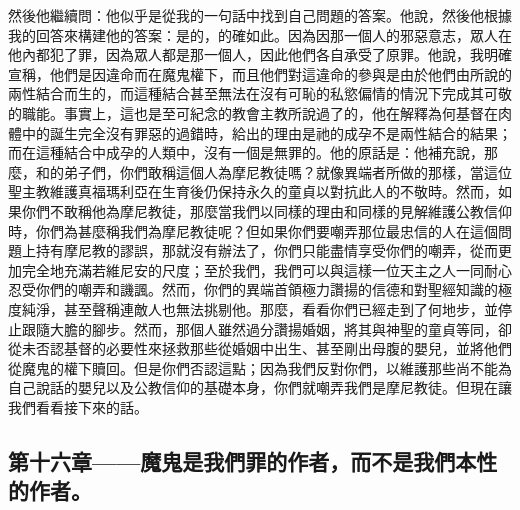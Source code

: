 然後他繼續問：他似乎是從我的一句話中找到自己問題的答案。他說，然後他根據我的回答來構建他的答案：是的，的確如此。因為因那一個人的邪惡意志，眾人在他內都犯了罪，因為眾人都是那一個人，因此他們各自承受了原罪。他說，我明確宣稱，他們是因違命而在魔鬼權下，而且他們對這違命的參與是由於他們由所說的兩性結合而生的，而這種結合甚至無法在沒有可恥的私慾偏情的情況下完成其可敬的職能。事實上，這也是至可紀念的教會主教所說過了的，他在解釋為何基督在肉體中的誕生完全沒有罪惡的過錯時，給出的理由是祂的成孕不是兩性結合的結果；而在這種結合中成孕的人類中，沒有一個是無罪的。他的原話是：他補充說，那麼，和的弟子們，你們敢稱這個人為摩尼教徒嗎？就像異端者所做的那樣，當這位聖主教維護真福瑪利亞在生育後仍保持永久的童貞以對抗此人的不敬時。然而，如果你們不敢稱他為摩尼教徒，那麼當我們以同樣的理由和同樣的見解維護公教信仰時，你們為甚麼稱我們為摩尼教徒呢？但如果你們要嘲弄那位最忠信的人在這個問題上持有摩尼教的謬誤，那就沒有辦法了，你們只能盡情享受你們的嘲弄，從而更加完全地充滿若維尼安的尺度；至於我們，我們可以與這樣一位天主之人一同耐心忍受你們的嘲弄和譏諷。然而，你們的異端首領極力讚揚的信德和對聖經知識的極度純淨，甚至聲稱連敵人也無法挑剔他。那麼，看看你們已經走到了何地步，並停止跟隨大膽的腳步。然而，那個人雖然過分讚揚婚姻，將其與神聖的童貞等同，卻從未否認基督的必要性來拯救那些從婚姻中出生、甚至剛出母腹的嬰兒，並將他們從魔鬼的權下贖回。但是你們否認這點；因為我們反對你們，以維護那些尚不能為自己說話的嬰兒以及公教信仰的基礎本身，你們就嘲弄我們是摩尼教徒。但現在讓我們看看接下來的話。\par


\subsection{第十六章——魔鬼是我們罪的作者，而不是我們本性的作者。}

